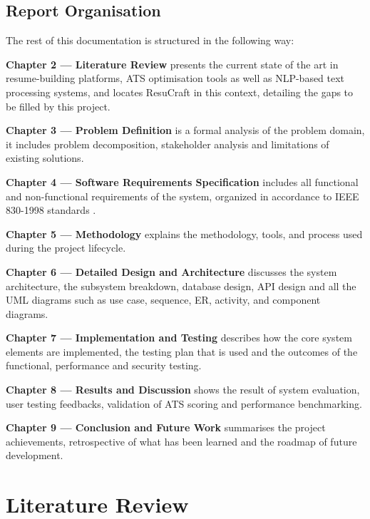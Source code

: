 \documentclass[12pt, a4paper, oneside]{report}
\begin{document}
\section{Report Organisation}

The rest of this documentation is structured in the following way:

\textbf{Chapter 2 --- Literature Review} presents the current state of the art in resume-building platforms, ATS optimisation tools as well as NLP-based text processing systems, and locates ResuCraft in this context, detailing the gaps to be filled by this project.

\textbf{Chapter 3 --- Problem Definition} is a formal analysis of the problem domain, it includes problem decomposition, stakeholder analysis and limitations of existing solutions.

\textbf{Chapter 4 --- Software Requirements Specification} includes all functional and non-functional requirements of the system, organized in accordance to IEEE 830-1998 standards \cite{ieee830}.

\textbf{Chapter 5 --- Methodology} explains the methodology, tools, and process used during the project lifecycle.

\textbf{Chapter 6 --- Detailed Design and Architecture} discusses the system architecture, the subsystem breakdown, database design, API design and all the UML diagrams such as use case, sequence, ER, activity, and component diagrams.

\textbf{Chapter 7 --- Implementation and Testing} describes how the core system elements are implemented, the testing plan that is used and the outcomes of the functional, performance and security testing.

\textbf{Chapter 8 --- Results and Discussion} shows the result of system evaluation, user testing feedbacks, validation of ATS scoring and performance benchmarking.

\textbf{Chapter 9 --- Conclusion and Future Work} summarises the project achievements, retrospective of what has been learned and the roadmap of future development.

\chapter{Literature Review}
\end{document}
